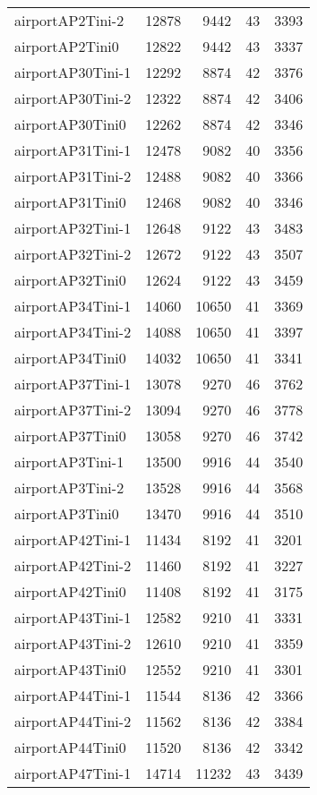 \begin{longtable}{lrrrr}
airportAP2Tini-2 & 12878 & 9442 & 43 & 3393 \\
airportAP2Tini0 & 12822 & 9442 & 43 & 3337 \\
airportAP30Tini-1 & 12292 & 8874 & 42 & 3376 \\
airportAP30Tini-2 & 12322 & 8874 & 42 & 3406 \\
airportAP30Tini0 & 12262 & 8874 & 42 & 3346 \\
airportAP31Tini-1 & 12478 & 9082 & 40 & 3356 \\
airportAP31Tini-2 & 12488 & 9082 & 40 & 3366 \\
airportAP31Tini0 & 12468 & 9082 & 40 & 3346 \\
airportAP32Tini-1 & 12648 & 9122 & 43 & 3483 \\
airportAP32Tini-2 & 12672 & 9122 & 43 & 3507 \\
airportAP32Tini0 & 12624 & 9122 & 43 & 3459 \\
airportAP34Tini-1 & 14060 & 10650 & 41 & 3369 \\
airportAP34Tini-2 & 14088 & 10650 & 41 & 3397 \\
airportAP34Tini0 & 14032 & 10650 & 41 & 3341 \\
airportAP37Tini-1 & 13078 & 9270 & 46 & 3762 \\
airportAP37Tini-2 & 13094 & 9270 & 46 & 3778 \\
airportAP37Tini0 & 13058 & 9270 & 46 & 3742 \\
airportAP3Tini-1 & 13500 & 9916 & 44 & 3540 \\
airportAP3Tini-2 & 13528 & 9916 & 44 & 3568 \\
airportAP3Tini0 & 13470 & 9916 & 44 & 3510 \\
airportAP42Tini-1 & 11434 & 8192 & 41 & 3201 \\
airportAP42Tini-2 & 11460 & 8192 & 41 & 3227 \\
airportAP42Tini0 & 11408 & 8192 & 41 & 3175 \\
airportAP43Tini-1 & 12582 & 9210 & 41 & 3331 \\
airportAP43Tini-2 & 12610 & 9210 & 41 & 3359 \\
airportAP43Tini0 & 12552 & 9210 & 41 & 3301 \\
airportAP44Tini-1 & 11544 & 8136 & 42 & 3366 \\
airportAP44Tini-2 & 11562 & 8136 & 42 & 3384 \\
airportAP44Tini0 & 11520 & 8136 & 42 & 3342 \\
airportAP47Tini-1 & 14714 & 11232 & 43 & 3439 \\

\end{longtable}

